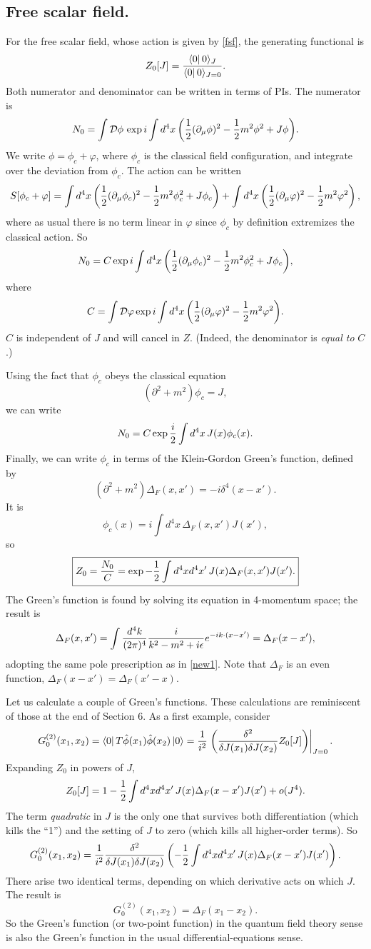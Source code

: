 \documentclass[12pt]{article}
\begin{document}
\subsection{Free scalar field.}
For the free scalar field, whose action is given by \eqref{fsf}, the
generating functional is
\[
Z_0[J]={\left\langle0\right|0\rangle_J\over\left\langle0\right|0\rangle_{J=0}}.
\]
Both numerator and denominator
can be written in terms of PIs. The numerator is
\[
N_0=\int\DD \phi\, \exp{i\int d^4x
\left(\half(\partial_\mu\phi)^2-\half m^2\phi^2+J\phi\right)}.
\]
We write $\phi=\phi_c+\varphi$, where $\phi_c$ is the classical field
configuration, and integrate over the deviation from $\phi_c$. The
action can be written
\[
S[\phi_c+\varphi]=
\int d^4x\left({\frac 12}(\partial_\mu\phi_c)^2
-{\frac 12} m^2\phi_c^2+J\phi_c\right)
+\int d^4x\left({\frac 12}(\partial_\mu\varphi)^2-{\frac 12} m^2\varphi^2\right),
\]
where as usual there is no term linear in $\varphi$ since $\phi_c$ by
definition extremizes the classical action. So
\[
N_0=C \exp{i\int d^4x\left({\frac 12}(\partial_\mu\phi_c)^2
-{\frac 12}m^2\phi_c^2+J\phi_c\right)},
\]
where
\[
C=\int\DD\varphi \exp{i\int d^4x\left(\half(\partial_\mu\varphi)^2
-\half m^2\varphi^2\right)}.
\]
$C$ is independent of $J$ and will cancel in $Z$. (Indeed, the
denominator is {\em equal to} $C$.)

Using the fact that $\phi_c$ obeys the classical equation
\[
(\partial^2+m^2)\phi_c=J,
\]
we can write
\[
N_0=C \exp{{i\over2}\int d^4x\,J(x)\phi_c(x)}.
\]
Finally, we can write $\phi_c$ in terms of the Klein-Gordon Green's
function, defined by
\[
(\partial^2+m^2)\Delta_F(x,x')=-i\delta^4(x-x').
\]
It is
\[
\phi_c(x)=i\int d^4x\,\Delta_F(x,x')J(x'),
\]
so
\[
\fbox{$\displaystyle
Z_0={N_0\over C}=
\exp{-{\frac 12}\int d^4x d^4x'\,J(x)\Delta_F(x,x')J(x')}.
$}
\]
The Green's function is found by solving its equation in 4-momentum
space; the result is
\[
\Delta_F(x,x')=\int{d^4k\over(2\pi)^4}{i\over k^2-m^2+i\epsilon}
e^{-ik\cdot(x-x')}=\Delta_F(x-x'),
\]
adopting the same pole prescription as in \eqref{new1}.
Note that $\Delta_F$ is an even function,
$\Delta_F(x-x')=\Delta_F(x'-x)$.

Let us calculate a couple of Green's functions. These calculations are
reminiscent of those at the end of Section 6. As a first example,
consider
\[
G_0^{(2)}(x_1,x_2)=\left\langle0\right|T\hat\phi(x_1)\hat\phi(x_2)\left|0\right\rangle
={1\over i^2}\left.\left({\delta^2\over\delta J(x_1)\delta J(x_2)}
Z_0[J]\right)\right|_{J=0}.
\]
Expanding $Z_0$ in powers of $J$,
\[
Z_0[J]=1-{\frac 12}\int d^4x d^4x'\,
J(x)\Delta_F(x-x')J(x')+o(J^4).
\]
The term {\em quadratic} in $J$ is the only one that survives both
differentiation (which kills the ``1'') and the setting of $J$ to zero
(which kills all higher-order terms). So
\[
G_0^{(2)}(x_1,x_2)={1\over i^2}
{\delta^2\over\delta J(x_1)\delta J(x_2)}
\left(-{\frac 12}\int d^4x d^4x'\,J(x)\Delta_F(x-x')J(x')\right).
\]
There arise two identical terms, depending on which derivative acts on
which $J$. The result is
\[
G_0^{(2)}(x_1,x_2)=\Delta_F(x_1-x_2).
\]
So the Green's function (or two-point function) in the quantum field
theory sense is also the Green's function in the usual
differential-equations sense.
\end{document}
